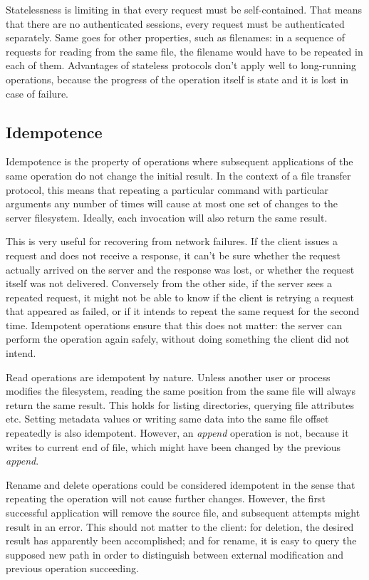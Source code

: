 Statelessness is limiting in that every request must be self-contained. That means that there are no
authenticated sessions, every request must be authenticated separately. Same goes for other properties, such
as filenames: in a sequence of requests for reading from the same file, the filename would have to be repeated
in each of them.  Advantages of stateless protocols don't apply well to long-running operations, because the
progress of the operation itself is state and it is lost in case of failure.

\subsection{Idempotence}

Idempotence is the property of operations where subsequent applications of the same operation do not change
the initial result. In the context of a file transfer protocol, this means that repeating a particular command
with particular arguments any number of times will cause at most one set of changes to the server filesystem.
Ideally, each invocation will also return the same result.

This is very useful for recovering from network failures. If the client issues a request and does not receive
a response, it can't be sure whether the request actually arrived on the server and the response was lost, or
whether the request itself was not delivered. Conversely from the other side, if the server sees a repeated
request, it might not be able to know if the client is retrying a request that appeared as failed, or if it
intends to repeat the same request for the second time. Idempotent operations ensure that this does not
matter: the server can perform the operation again safely, without doing something the client did not intend.

Read operations are idempotent by nature. Unless another user or process modifies the filesystem, reading the
same position from the same file will always return the same result.  This holds for listing directories,
querying file attributes etc. Setting metadata values or writing same data into the same file offset
repeatedly is also idempotent. However, an {\it append} operation is not, because it writes to current end of
file, which might have been changed by the previous {\it append}.

Rename and delete operations could be considered idempotent in the sense that repeating the operation will not
cause further changes. However, the first successful application will remove the source file, and subsequent
attempts might result in an error. This should not matter to the client: for deletion, the desired result has
apparently been accomplished; and for rename, it is easy to query the supposed new path in order to
distinguish between external modification and previous operation succeeding.

